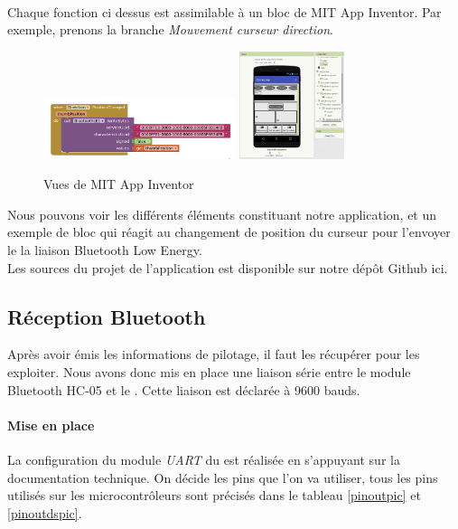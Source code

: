 		\\Chaque fonction ci dessus est assimilable à un bloc de MIT App Inventor. Par exemple, prenons la branche \textit{Mouvement curseur direction}.
		\begin{figure}
			\begin{center}		
				\includegraphics[width=0.5\textwidth]{../Illus/MITBlock.png}
				\includegraphics[width=0.275\textwidth]{../Illus/MITScreen.png}
			\end{center}
			\caption{Vues de MIT App Inventor}
		\end{figure}
		Nous pouvons voir les différents éléments constituant notre application, et un exemple de bloc qui réagit au changement de position du curseur pour l'envoyer le la liaison Bluetooth Low Energy.
		\\Les sources du projet de l'application est disponible sur notre dépôt Github ici\cite{git}.
			\subsection{Réception Bluetooth}
			Après avoir émis les informations de pilotage, il faut les récupérer pour les exploiter. Nous avons donc mis en place une liaison série entre le module Bluetooth HC-05 et le \pic. Cette liaison est déclarée à 9600 bauds.
			\paragraph{Mise en place}La configuration du module \textit{UART} du \pic est réalisée en s'appuyant sur la documentation technique\cite[p.~315]{DatasheetPIC}. On décide les pins que l'on va utiliser, tous les pins utilisés sur les microcontrôleurs sont précisés dans le tableau \ref{pinoutpic} et \ref{pinoutdspic}.
			
			
